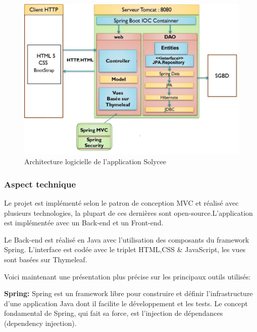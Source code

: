 \documentclass[12pt]{article}
\begin{document}
\begin{figure}[H]
    \centering
    \includegraphics[width=0.9 \textwidth]{diagrammes/archiSolycee.png}
    \caption{Architecture logicielle de l'application Solycee }
\end{figure}

\subsubsection{Aspect technique}

Le projet est implémenté selon le patron de conception MVC et réalisé avec plusieurs technologies, la plupart de ces dernières sont open-source.L'application est implémentée avec un Back-end et un Front-end.

Le Back-end est réalisé en Java avec l'utilisation des composants du framework Spring. L'interface est codée avec le triplet HTML,CSS \& JavaScript, les vues sont basées sur Thymeleaf. 

Voici maintenant une présentation plus précise sur les principaux outils utilisés:\newline

\textbf{Spring:} Spring est un framework libre pour construire et définir l'infrastructure d'une application Java dont il facilite le développement et les tests. Le concept fondamental de Spring, qui fait sa force, est l'injection de dépendances (dependency injection).\newline
\end{document}
